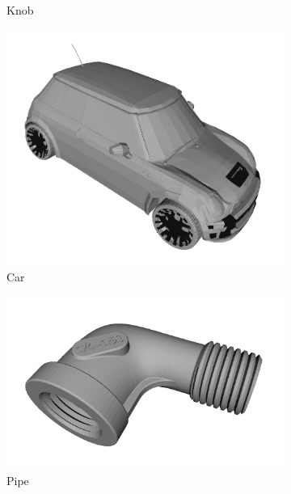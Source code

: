 \begin{figure}[t]
\begin{subfigure}[b]{0.16\linewidth}
		\caption{Knob}
	\end{subfigure} 
	\begin{subfigure}[b]{0.16\linewidth} \centering
		\includegraphics[width=1\linewidth]{./fig/eval/toshiba_mini1.png}
		\caption{Car}
	\end{subfigure}
	\begin{subfigure}[b]{0.16\linewidth} \centering
		\includegraphics[width=1\linewidth]{./fig/eval/toshiba_pipe1.png}
		\caption{Pipe}
	\end{subfigure}
	\begin{subfigure}[b]{0.16\linewidth} \centering

\end{subfigure}
\end{figure}
